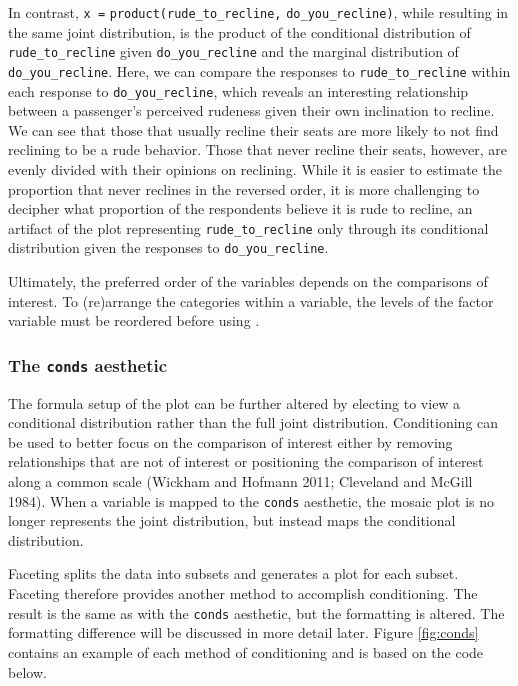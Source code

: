 In contrast, \texttt{x\ =} \texttt{product(rude\_to\_recline,} \texttt{do\_you\_recline)}, while resulting in the same joint distribution, is the product of the conditional distribution of \texttt{rude\_to\_recline} given \texttt{do\_you\_recline} and the marginal distribution of \texttt{do\_you\_recline}. Here, we can compare the responses to \texttt{rude\_to\_recline} within each response to \texttt{do\_you\_recline}, which reveals an interesting relationship between a passenger's perceived rudeness given their own inclination to recline. We can see that those that usually recline their seats are more likely to not find reclining to be a rude behavior. Those that never recline their seats, however, are evenly divided with their opinions on reclining. While it is easier to estimate the proportion that never reclines in the reversed order, it is more challenging to decipher what proportion of the respondents believe it is rude to recline, an artifact of the plot representing \texttt{rude\_to\_recline} only through its conditional distribution given the responses to \texttt{do\_you\_recline}.

Ultimately, the preferred order of the variables depends on the comparisons of interest. To (re)arrange the categories within a variable, the levels of the factor variable must be reordered before using .

\hypertarget{the-conds-aesthetic}{%
\subsubsection{\texorpdfstring{The \texttt{conds} aesthetic}{The conds aesthetic}}\label{the-conds-aesthetic}}

The formula setup of the plot can be further altered by electing to view a conditional distribution rather than the full joint distribution. Conditioning can be used to better focus on the comparison of interest either by removing relationships that are not of interest or positioning the comparison of interest along a common scale (Wickham and Hofmann 2011; Cleveland and McGill 1984). When a variable is mapped to the \texttt{conds} aesthetic, the mosaic plot is no longer represents the joint distribution, but instead maps the conditional distribution.

Faceting splits the data into subsets and generates a plot for each subset. Faceting therefore provides another method to accomplish conditioning. The result is the same as with the \texttt{conds} aesthetic, but the formatting is altered. The formatting difference will be discussed in more detail later. Figure \ref{fig:conds} contains an example of each method of conditioning and is based on the code below.

